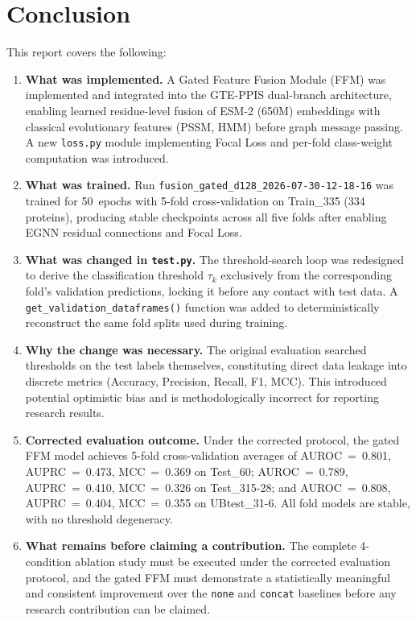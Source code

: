\documentclass[11pt,a4paper]{article}
\begin{document}
\section{Conclusion}

This report covers the following:

\begin{enumerate}
    \item \textbf{What was implemented.} A Gated Feature Fusion Module (FFM) was
          implemented and integrated into the GTE-PPIS dual-branch architecture,
          enabling learned residue-level fusion of ESM-2 (650M) embeddings with
          classical evolutionary features (PSSM, HMM) before graph message passing.
          A new \texttt{loss.py} module implementing Focal Loss and per-fold
          class-weight computation was introduced.

    \item \textbf{What was trained.} Run \texttt{fusion\_gated\_d128\_2026-07-30-12-18-16}
          was trained for 50~epochs with 5-fold cross-validation on Train\_335
          (334 proteins), producing stable checkpoints across all five folds after
          enabling EGNN residual connections and Focal Loss.

    \item \textbf{What was changed in \texttt{test.py}.} The threshold-search loop
          was redesigned to derive the classification threshold $\tau_k$ exclusively
          from the corresponding fold's validation predictions, locking it before any
          contact with test data. A \texttt{get\_validation\_dataframes()} function
          was added to deterministically reconstruct the same fold splits used during
          training.

    \item \textbf{Why the change was necessary.} The original evaluation searched
          thresholds on the test labels themselves, constituting direct data leakage
          into discrete metrics (Accuracy, Precision, Recall, F1, MCC). This
          introduced potential optimistic bias and is methodologically incorrect for
          reporting research results.

    \item \textbf{Corrected evaluation outcome.} Under the corrected protocol, the
          gated FFM model achieves 5-fold cross-validation averages of
          AUROC~=~0.801, AUPRC~=~0.473, MCC~=~0.369 on Test\_60;
          AUROC~=~0.789, AUPRC~=~0.410, MCC~=~0.326 on Test\_315-28; and
          AUROC~=~0.808, AUPRC~=~0.404, MCC~=~0.355 on UBtest\_31-6.
          All fold models are stable, with no threshold degeneracy.

    \item \textbf{What remains before claiming a contribution.} The complete
          4-condition ablation study must be executed under the corrected evaluation
          protocol, and the gated FFM must demonstrate a statistically meaningful
          and consistent improvement over the \texttt{none} and \texttt{concat}
          baselines before any research contribution can be claimed.
\end{enumerate}
\end{document}
